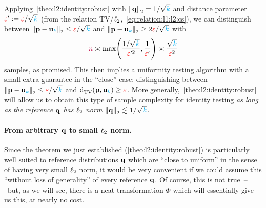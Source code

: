 Applying~\cref{theo:l2:identity:robust} with $\normtwo{\q} = 1/\sqrt{\ab}$ and distance parameter $\dst' \eqdef \dst/\sqrt{\ab}$ (from the relation TV/$\lp[2]$,~\cref{eq:relation:l1:l2:cs}), we can distinguish between
$\normtwo{\p-\uniform_\ab} \leq \dst/\sqrt{\ab}$ and $\normtwo{\p-\uniform_\ab} \geq 2\dst/\sqrt{\ab}$
with 
\[
	\ns \asymp \max\Paren{\frac{1/\sqrt{\ab}}{\dst'^2}, \frac{1}{\dst'}} \asymp \frac{\sqrt{\ab}}{\dst^2}
\]
samples, as promised. This then implies a uniformity testing algorithm with a small extra guarantee in the ``close'' case: distinguishing between $\normtwo{\p-\uniform_\ab} \leq \dst/\sqrt{\ab}$ and $\totalvardist{\p}{\uniform_\ab} \geq \dst$. More generally,~\cref{theo:l2:identity:robust} will allow us to obtain this type of sample complexity for identity testing \emph{as long as the reference $\q$ has $\lp[2]$ norm $\normtwo{\q} \lesssim 1/\sqrt{\ab}$.}

\paragraph{From arbitrary $\q$ to small $\lp[2]$ norm.} Since the theorem we just established (\cref{theo:l2:identity:robust}) is particularly well suited to reference distributions $\q$ which are ``close to uniform'' in the sense of having very small $\lp[2]$ norm, it would be very convenient if we could assume this ``without loss of generality'' of every reference $\q$. Of course, this is not true~--~but, as we will see, there is a neat transformation $\Phi$ which will essentially give us this, at nearly no cost.

